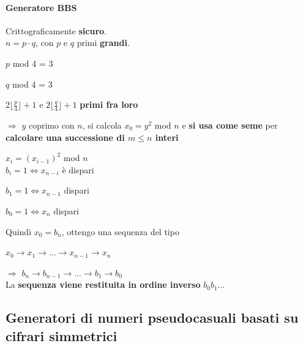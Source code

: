 \documentclass[10pt]{book}
\begin{document}
\paragraph{Generatore BBS} Crittograficamente \textbf{sicuro}.\\
$n = p\cdot q$, con $p$ e $q$ primi \textbf{grandi}.
\begin{list}{}{}
	\item $p$ mod 4 = 3
	\item $q$ mod 4 = 3
	\item $2\lfloor \frac{p}{4}\rfloor + 1$ e $2\lfloor \frac{q}{4}\rfloor + 1$ \textbf{primi fra loro}
	\item[$\Rightarrow$] $y$ coprimo con $n$, si calcola $x_0 = y^2$ mod $n$ e \textbf{si usa come seme} per \textbf{calcolare una successione di $m\leq n$ interi}
	\item $x_i = (x_{i-1})^2$ mod $n$\\
	$b_i = 1 \Leftrightarrow x_{n-i}$ è dispari
	\begin{list}{}{}
		\item $b_1 = 1 \Leftrightarrow x_{n-1}$ dispari
		\item $b_0 = 1 \Leftrightarrow x_{n}$ dispari
	\end{list}
\end{list}
Quindi $x_0 = b_n$, ottengo una sequenza del tipo
\begin{list}{}{}
	\item $x_0 \rightarrow x_1 \rightarrow \ldots \rightarrow x_{n-1} \rightarrow x_n$
	\item[$\Rightarrow$] $b_n \rightarrow b_{n-1} \rightarrow \ldots \rightarrow b_1 \rightarrow b_0$\\
	La \textbf{sequenza viene restituita in ordine inverso} $b_0 b_1\ldots$
\end{list}
\subsection{Generatori di numeri pseudocasuali basati su cifrari simmetrici}
\end{document}
